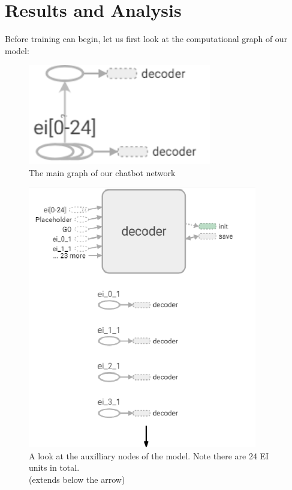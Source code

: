 \documentclass[titlepage]{article}
\begin{document}
\section{Results and Analysis}
Before training can begin, let us first look at the computational graph of our model:
\begin{figure}[H]
	\centering
	\includegraphics[width=80mm]{main_graph.png}
	\caption{The main graph of our chatbot network}
	\label{fig:maingraph}
\end{figure}
\begin{figure}[H]
	\centering
	\includegraphics[width=100mm]{aux_nodes.png}
	\caption{A look at the auxilliary nodes of the model. Note there are 24 EI units in total.\\(extends below the arrow)}
	\label{fig:auxnodes}
\end{figure}
\end{document}
